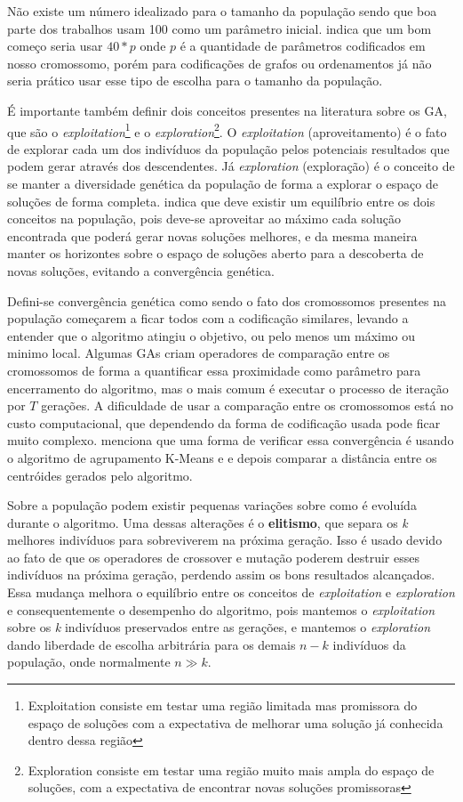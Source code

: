 Não existe um número idealizado para o tamanho da população sendo que boa parte dos trabalhos usam 100 como um parâmetro inicial. \citeauthor{Linden2008} indica que um bom começo seria usar \(40 * p\) onde \(p\) é a quantidade de parâmetros codificados em nosso cromossomo, porém para codificações de grafos ou ordenamentos já não seria prático usar esse tipo de escolha para o tamanho da população.

É importante também definir dois conceitos presentes na literatura sobre os GA, que são o \textit{exploitation}\footnote{Exploitation consiste em testar uma região limitada mas promissora do espaço de soluções com a expectativa de melhorar uma solução já conhecida dentro dessa região} e o \textit{exploration}\footnote{Exploration consiste em testar uma região muito mais ampla do espaço de soluções, com a expectativa de encontrar novas soluções promissoras}. O \textit{exploitation} (aproveitamento) é o fato de explorar cada um dos indivíduos da população pelos potenciais resultados que podem gerar através dos descendentes. Já \textit{exploration} (exploração) é o conceito de se manter a diversidade genética da população de forma a explorar o espaço de soluções de forma completa. \citeauthor{Holland1992} indica que deve existir um equilíbrio entre os dois conceitos na população, pois deve-se aproveitar ao máximo cada solução encontrada que poderá gerar novas soluções melhores, e da mesma maneira manter os horizontes sobre o espaço de soluções aberto para a descoberta de novas soluções, evitando a convergência genética.

Defini-se convergência genética como sendo o fato dos cromossomos presentes na população começarem a ficar todos com a codificação similares, levando a entender que o algoritmo atingiu o objetivo, ou pelo menos um máximo ou minimo local. Algumas GAs criam operadores de comparação entre os cromossomos de forma a quantificar essa proximidade como parâmetro para encerramento do algoritmo, mas o mais comum é executar o processo de iteração por \(T\) gerações. A dificuldade de usar a comparação entre os cromossomos está no custo computacional, que dependendo da forma de codificação usada pode ficar muito complexo. \citeauthor{Linden2008} menciona que uma forma de verificar essa convergência é usando o algoritmo de agrupamento K-Means e e depois comparar a distância entre os centróides gerados pelo algoritmo.

Sobre a população podem existir pequenas variações sobre como é evoluída durante o algoritmo. Uma dessas alterações é o \textbf{elitismo}, que separa os \textit{k} melhores indivíduos para sobreviverem na próxima geração. Isso é usado devido ao fato de que os operadores de crossover e mutação poderem destruir esses indivíduos na próxima geração, perdendo assim os bons resultados alcançados. Essa mudança melhora o equilíbrio entre os conceitos de \textit{exploitation} e \textit{exploration} e consequentemente o desempenho do algoritmo, pois mantemos o \textit{exploitation} sobre os \textit{k} indivíduos preservados entre as gerações, e mantemos o \textit{exploration} dando liberdade de escolha arbitrária para os demais \(n-k\) indivíduos da população, onde normalmente \(n \gg k\). 

